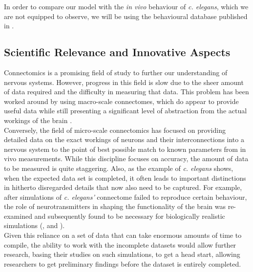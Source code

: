 \documentclass[a4paper,11pt]{article}
\begin{document}
\begin{enumerate}
In order to compare our model with the \emph{in vivo} behaviour of \emph{c. elegans}, which we are not equipped to observe, we will be using the behavioural database published in \citep{yemini2013database}.
\end{enumerate}

\subsection{Scientific Relevance and Innovative Aspects}
Connectomics is a promising field of study to further our understanding of nervous systems. However, progress in this field is slow due to the sheer amount of data required and the difficulty in measuring that data. This problem has been worked around by using macro-scale connectomes, which do appear to provide useful data while still presenting a significant level of abstraction from the actual workings of the brain \citep{TheMissingArticle}. 
\\[0,2cm]

Conversely, the field of micro-scale connectomics has focused on providing detailed data on the exact workings of neurons and their interconnections into a nervous system to the point of best possible match to known parameters from in vivo measurements. While this discipline focuses on accuracy, the amount of data to be measured is quite staggering. Also, as the example of \emph{c. elegans} shows, when the expected data set is completed, it often leads to important distinctions in hitherto disregarded details that now also need to be captured. For example, after simulations of \emph{c. elegans'} connectome failed to reproduce certain behaviour, the role of neurotransmitters in shaping the functionality of the brain was re-examined and subsequently found to be necessary for biologically realistic simulations (\citep{Bargmann2012}, \citep{Izquierdo2013} and \citep{Ogg1997}).\\[0,2cm]

Given this reliance on a set of data that can take enormous amounts of time to compile, the ability to work with the incomplete datasets would allow further research, basing their studies on such simulations, to get a head start, allowing researchers to get preliminary findings before the dataset is entirely completed. \\[0,2cm]
\end{document}
